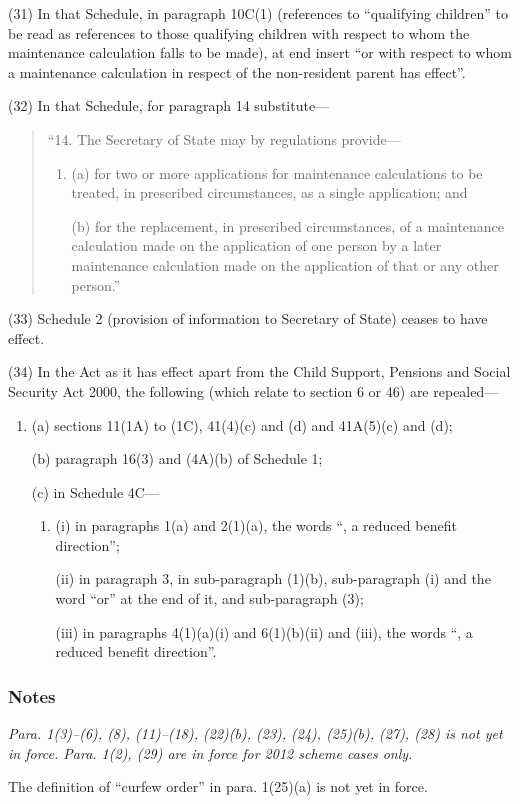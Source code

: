 \documentclass[a4paper]{article}
\newcommand\amendment[1]{\subsubsection*{Notes}{\itshape\frenchspacing\footnotesize #1 \par}}
\begin{document}
(31) In that Schedule, in paragraph 10C(1) (references to “qualifying children” to be read as references to those qualifying children with respect to whom the maintenance calculation falls to be made), at end insert  “or with respect to whom a maintenance calculation in respect of the non-resident parent has effect”.

(32) In that Schedule, for paragraph 14 substitute—
\begin{quotation}
“14. The Secretary of State may by regulations provide—
\begin{enumerate}\item[]
(a) for two or more applications for maintenance calculations to be treated, in prescribed circumstances, as a single application; and

(b) for the replacement, in prescribed circumstances, of a maintenance calculation made on the application of one person by a later maintenance calculation made on the application of that or any other person.”
\end{enumerate}
\end{quotation}

(33) Schedule 2 (provision of information to Secretary of State) ceases to have effect.

(34) In the Act as it has effect apart from the Child Support, Pensions and Social Security Act 2000, the following (which relate to section 6 or 46) are repealed—
\begin{enumerate}\item[]
(a) sections 11(1A) to (1C), 41(4)(c) and (d) and 41A(5)(c) and (d);

(b) paragraph 16(3) and (4A)(b) of Schedule 1;

(c) in Schedule 4C—
\begin{enumerate}\item[]
(i) in paragraphs 1(a) and 2(1)(a), the words “, a reduced benefit direction”;

(ii) in paragraph 3, in sub-paragraph (1)(b), sub-paragraph (i) and the word “or” at the end of it, and sub-paragraph (3);

(iii) in paragraphs 4(1)(a)(i) and 6(1)(b)(ii) and (iii), the words “, a reduced benefit direction”.
\end{enumerate}
\end{enumerate}

\amendment{Para. 1(3)--(6), (8), (11)--(18), (22)(b), (23), (24), (25)(b), (27), (28) is not yet in force.  Para. 1(2), (29) are in force for 2012 scheme cases only.

The definition of ``curfew order'' in para. 1(25)(a) is not yet in force.

}
\end{document}
